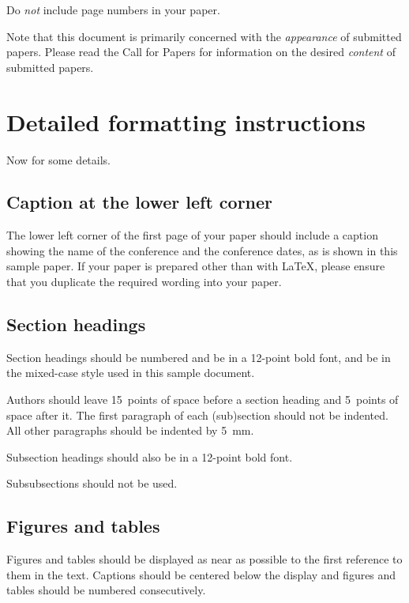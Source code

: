 \documentclass[twocolumn]{article}
\begin{document}
Do \emph{not} include page numbers in your paper.


Note that this document is primarily concerned with the
\emph{appearance} of submitted papers.  Please read the Call for
Papers for information on the desired \emph{content} of submitted
papers.


\section{Detailed formatting instructions}

Now for some details.

\subsection{Caption at the lower left corner}

The lower left corner of the first page of your paper should include a
caption showing the name of the conference and the conference dates,
as is shown in this sample paper.  If your paper is prepared other
than with {\LaTeX}, please ensure that you duplicate the required
wording into your paper.


\subsection{Section headings}

Section headings should be numbered and be in a 12-point bold
font, and be in the mixed-case style used in this sample document.

Authors should leave 15~points of space before a section heading and
5~points of space after it.  The first paragraph of each (sub)section
should not be indented.  All other paragraphs should be indented by
5~mm.

Subsection headings should also be in a 12-point bold font.

Subsubsections should not be used.

\subsection{Figures and tables}

Figures and tables should be displayed as near as possible to the
first reference to them in the text.  Captions should be centered
below the display and figures and tables should be numbered
consecutively.
\end{document}
